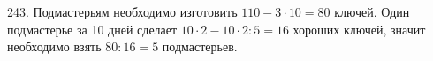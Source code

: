 243. Подмастерьям необходимо изготовить $110-3\cdot10=80$ ключей. Один подмастерье за 10 дней сделает $10\cdot2-10\cdot2:5=16$ хороших ключей, значит необходимо взять $80:16=5$ подмастерьев.\\
